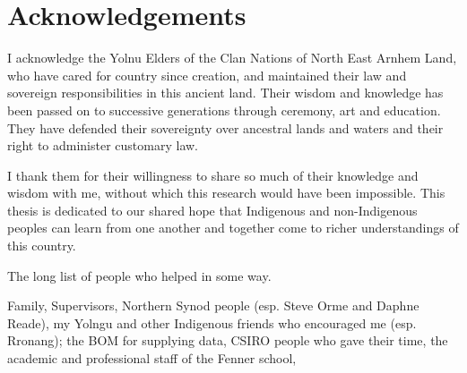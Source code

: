 \chapter{Acknowledgements}

I acknowledge the Yolnu Elders of the Clan Nations of North East Arnhem
Land, who have cared for country since creation, and maintained their
law and sovereign responsibilities in this ancient land.
%
Their wisdom and knowledge has been passed on to successive generations
through ceremony, art and education.  They have defended their sovereignty
over ancestral lands and waters and their right to administer customary law.

I thank them for their willingness to share so much of their knowledge
and wisdom with me, without which this research would have been impossible.
%
This thesis is dedicated to our shared hope that Indigenous and non-Indigenous
peoples can learn from one another and together come to richer understandings
of this country.


\vspace{1.5in}



The long list of people who helped in some way.

Family, Supervisors, Northern Synod people (esp. Steve Orme and Daphne Reade),
my Yolngu and other Indigenous friends who encouraged me (esp. Rronang);
the BOM for supplying data, CSIRO people who gave their time,
the academic and professional staff of the Fenner school,


